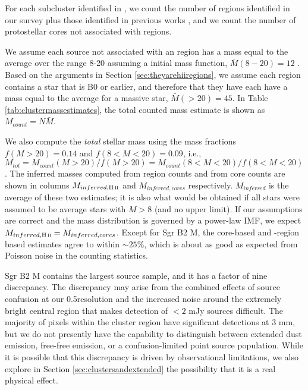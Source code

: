 \documentclass[twocolumn]{aastex61}
\begin{document}


For each subcluster identified in \citet[][see Figure
\ref{fig:overview}]{Schmiedeke2016a}, we count the number of \hii regions
identified in our survey plus those identified in previous works
\citep{Gaume1995a,de-Pree1996a}, and we count the number of protostellar cores
not associated with \hii regions.  

We assume each source not associated with an \hii region has a mass equal to
the average over the range 8-20 \msun assuming a \citet{Kroupa2001a} initial
mass function, $\bar{M}(8-20) = 12$ \msun.  Based on the arguments in Section
\ref{sec:theyarehiiregions}, we assume each \hii region contains a star that is
B0 or earlier, and therefore that they have each have a mass equal to the
average for a massive star, $\bar{M}(>20) = 45$.  In Table
\ref{tab:clustermassestimates}, the total counted mass estimate is shown as
$M_{count} = N \bar{M}$.

We also compute the \emph{total} stellar mass using the mass fractions $f(M>20)
= 0.14$ and $f(8<M<20)=0.09$, i.e., $M_{tot} = M_{count}(M>20) / f(M>20) =
M_{count}(8<M<20) / f(8<M<20)$.  The inferred masses computed from \hii region
counts and from core counts are shown in columns $M_{inferred,\hii}$ and
$M_{inferred,cores}$ respectively. $M_{inferred}$ is the average of these two
estimates; it is also what would be obtained if all stars were assumed to be
average stars with $M>8$ \msun (and no upper limit).  If our assumptions are
correct and the mass distribution is governed by a power-law IMF, we expect
$M_{inferred,\hii} = M_{inferred,cores}$.  Except for Sgr B2 M, the core-based
and \hii-region based estimates agree to within $\sim25\%$, which is about as
good as expected from Poisson noise in the counting statistics.  

Sgr B2 M contains the largest source sample, and it has a factor of nine
discrepancy. The discrepancy may arise from the combined effects of source
confusion at our 0.5\arcsec resolution and the increased noise around the
extremely bright central region that makes detection of $<2$ mJy sources
difficult.  The majority of pixels within the cluster region have significant
detections at 3 mm, but we do not presently have the capability to distinguish
between extended dust emission, free-free emission, or a confusion-limited
point source population.  While it is possible that this discrepancy
is driven by observational limitations, we also explore in Section
\ref{sec:clustersandextended} the possibility that it is a real physical
effect.
\end{document}
